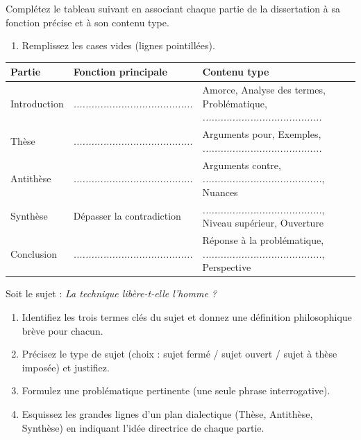 \documentclass[11pt]{article}
\begin{document}
\begin{exercice}
Complétez le tableau suivant en associant chaque partie de la dissertation à sa fonction précise et à son contenu type.
\begin{enumerate}
    \item Remplissez les cases vides (lignes pointillées).
\end{enumerate}
\medskip
\begin{tabularx}{\linewidth}{|X|X|X|}
\hline
\textbf{Partie} & \textbf{Fonction principale} & \textbf{Contenu type} \\
\hline
Introduction & \textit{........................................} & Amorce, Analyse des termes, Problématique, \textit{........................................} \\
\hline
Thèse & \textit{........................................} & Arguments pour, Exemples, \textit{........................................} \\
\hline
Antithèse & \textit{........................................} & Arguments contre, \textit{........................................}, Nuances \\
\hline
Synthèse & Dépasser la contradiction & \textit{........................................}, Niveau supérieur, Ouverture \\
\hline
Conclusion & \textit{........................................} & Réponse à la problématique, \textit{........................................}, Perspective \\
\hline
\end{tabularx}
\end{exercice}

\begin{exercice}
Soit le sujet : \og \textit{La technique libère-t-elle l'homme ?} \fg
\begin{enumerate}
    \item Identifiez les trois termes clés du sujet et donnez une définition philosophique brève pour chacun.
    \item Précisez le type de sujet (choix : sujet fermé / sujet ouvert / sujet à thèse imposée) et justifiez.
    \item Formulez une problématique pertinente (une seule phrase interrogative).
    \item Esquissez les grandes lignes d'un plan dialectique (Thèse, Antithèse, Synthèse) en indiquant l'idée directrice de chaque partie.
\end{enumerate}
\end{exercice}
\end{document}

